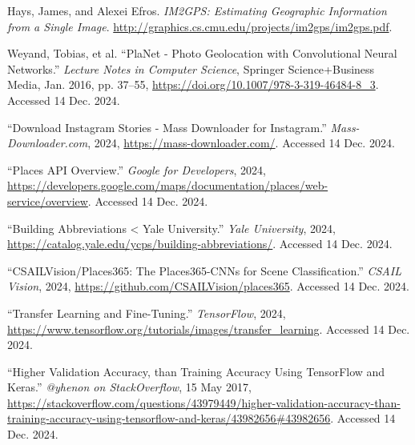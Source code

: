 \documentclass[letterpaper]{article} %
\begin{document}
\begin{thebibliography}{99}

Hays, James, and Alexei Efros. \textit{IM2GPS: Estimating Geographic Information from a Single Image}. \url{http://graphics.cs.cmu.edu/projects/im2gps/im2gps.pdf}.

Weyand, Tobias, et al. “PlaNet - Photo Geolocation with Convolutional Neural Networks.” \textit{Lecture Notes in Computer Science}, Springer Science+Business Media, Jan. 2016, pp. 37–55, \url{https://doi.org/10.1007/978-3-319-46484-8_3}. Accessed 14 Dec. 2024.

“Download Instagram Stories - Mass Downloader for Instagram.” \textit{Mass-Downloader.com}, 2024, \url{https://mass-downloader.com/}. Accessed 14 Dec. 2024.

“Places API Overview.” \textit{Google for Developers}, 2024, \url{https://developers.google.com/maps/documentation/places/web-service/overview}. Accessed 14 Dec. 2024.

“Building Abbreviations < Yale University.” \textit{Yale University}, 2024, \url{https://catalog.yale.edu/ycps/building-abbreviations/}. Accessed 14 Dec. 2024.

“CSAILVision/Places365: The Places365-CNNs for Scene Classification.” \textit{CSAIL Vision}, 2024, \url{https://github.com/CSAILVision/places365}. Accessed 14 Dec. 2024.

“Transfer Learning and Fine-Tuning.” \textit{TensorFlow}, 2024, \url{https://www.tensorflow.org/tutorials/images/transfer_learning}. Accessed 14 Dec. 2024.

“Higher Validation Accuracy, than Training Accuracy Using TensorFlow and Keras.” \textit{@yhenon on StackOverflow}, 15 May 2017, \url{https://stackoverflow.com/questions/43979449/higher-validation-accuracy-than-training-accuracy-using-tensorflow-and-keras/43982656#43982656}. Accessed 14 Dec. 2024.

\end{thebibliography}
\end{document}
